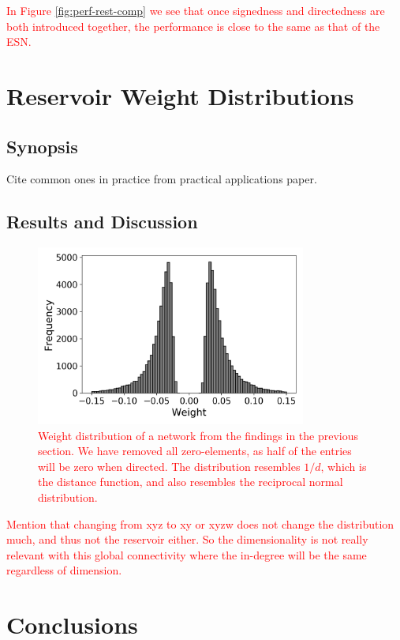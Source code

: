 \textcolor{red}{
  In Figure \ref{fig:perf-rest-comp} we see that once signedness and
directedness are both introduced together, the performance is close to the same
as that of the ESN.
}

\section{Reservoir Weight Distributions}

\subsection{Synopsis}

Cite common ones in practice from practical applications paper.

\subsection{Results and Discussion}

\begin{figure}[t]
  \centering
  \includegraphics[width=3.5in]{figures/rgg-dist.png}
  \caption{
    \textcolor{red}{
      Weight distribution of a network from the findings in the previous
section. We have removed all zero-elements, as half of the entries will be zero
when directed. The distribution resembles $1/d$, which is the distance function,
and also resembles the reciprocal normal distribution.
    }
  }
  \label{fig:rgg-dist}
\end{figure}

\textcolor{red}{
  Mention that changing from xyz to xy or xyzw does not change the distribution
much, and thus not the reservoir either. So the dimensionality is not really
relevant with this global connectivity where the in-degree will be the same
regardless of dimension.
}

\section{Conclusions}

